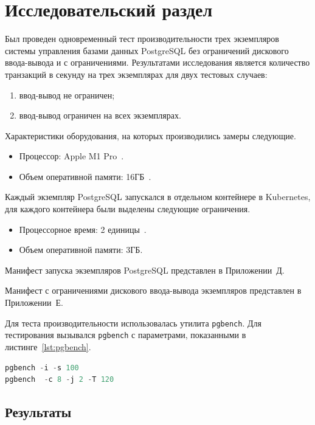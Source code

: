 \chapter{Исследовательский раздел}

Был проведен одновременный тест производительности трех экземпляров системы управления базами данных PostgreSQL без ограничений дискового ввода-вывода и с ограничениями. Результатами исследования является количество транзакций в секунду на трех экземплярах для двух тестовых случаев:

\begin{enumerate}
	\item ввод-вывод не ограничен;
	\item ввод-вывод ограничен на всех экземплярах.
\end{enumerate}

Характеристики оборудования, на которых производились замеры следующие.

\begin{itemize}
\item Процессор: Apple M1 Pro~\cite{mac}.
\item Объем оперативной памяти: 16ГБ~\cite{mac}.	
\end{itemize}

Каждый экземпляр PostgreSQL запускался в отдельном контейнере в Kubernetes, для каждого контейнера были выделены следующие ограничения.

\begin{itemize}
\item Процессорное время: 2 единицы~\cite{resource_management}.
\item Объем оперативной памяти: 3ГБ.	
\end{itemize}

Манифест запуска экземпляров PostgreSQL представлен в Приложении~Д.

Манифест с ограничениями дискового ввода-вывода экземпляров представлен в Приложении~Е.

Для теста производительности использовалась утилита \texttt{pgbench}. Для тестирования вызывался \texttt{pgbench} с параметрами, показанными в листинге~\ref{lst:pgbench}.

\begin{lstlisting}[language=Go,label=lst:pgbench, caption={Параметры pgbench}]
pgbench -i -s 100
pgbench  -c 8 -j 2 -T 120
\end{lstlisting}

\section{Результаты}

